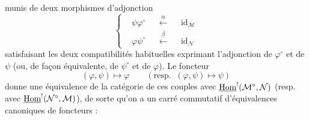 munis de deux morphismes d'adjonction
\[
\left\{
\begin{aligned}
&\psi\varphi^\circ &&\xleftarrow{\alpha} &&\mathrm{id}_{\mathcal{M}}\\
&\varphi\psi^\circ &&\xleftarrow{\beta} &&\mathrm{id}_{\mathcal{N}}
\end{aligned}
\right.
\tag*{(4.1.15)}
\]
satisfaisant les deux compatibilités habituelles exprimant l'adjonction de $\varphi^\circ$ et de $\psi$ (ou, de façon équivalente, de $\psi^\circ$ et de $\varphi$). Le foncteur
\[
(\varphi,\psi) \longmapsto \varphi \qquad (\text{resp.}\;\; (\varphi,\psi) \longmapsto \psi)
\]
donne une équivalence de la catégorie de ces couples avec $\underline{\mathrm{Hom}}^!(\mathcal{M}^\circ,\mathcal{N})$ (resp. avec $\underline{\mathrm{Hom}}^!(\mathcal{N}^\circ,\mathcal{M})$), de sorte qu'on a un carré commutatif d'équivalences canoniques de foncteurs :

